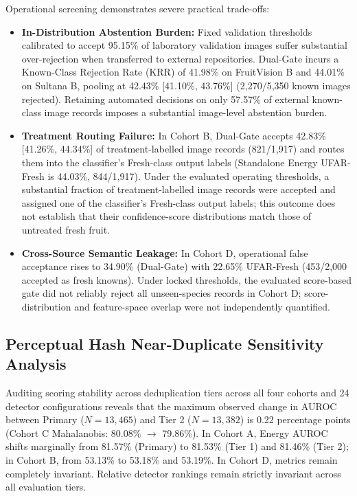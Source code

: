 Operational screening demonstrates severe practical trade-offs:
\begin{itemize}
\setlength{\itemsep}{0pt}\setlength{\parsep}{0pt}\setlength{\parskip}{0pt}\setlength{\topsep}{1pt}\setlength{\partopsep}{0pt}
\item \textbf{In-Distribution Abstention Burden:} Fixed validation thresholds calibrated to accept 95.15\% of laboratory validation images suffer substantial over-rejection when transferred to external repositories. Dual-Gate incurs a Known-Class Rejection Rate (KRR) of 41.98\% on FruitVision B and 44.01\% on Sultana B, pooling at 42.43\% [41.10\%, 43.76\%] (2,270/5,350 known images rejected). Retaining automated decisions on only 57.57\% of external known-class image records imposes a substantial image-level abstention burden.
\item \textbf{Treatment Routing Failure:} In Cohort B, Dual-Gate accepts 42.83\% [41.26\%, 44.34\%] of treatment-labelled image records (821/1,917) and routes them into the classifier's Fresh-class output labels (Standalone Energy UFAR-Fresh is 44.03\%, 844/1,917). Under the evaluated operating thresholds, a substantial fraction of treatment-labelled image records were accepted and assigned one of the classifier's Fresh-class output labels; this outcome does not establish that their confidence-score distributions match those of untreated fresh fruit.
\item \textbf{Cross-Source Semantic Leakage:} In Cohort D, operational false acceptance rises to 34.90\% (Dual-Gate) with 22.65\% UFAR-Fresh (453/2,000 accepted as fresh knowns). Under locked thresholds, the evaluated score-based gate did not reliably reject all unseen-species records in Cohort D; score-distribution and feature-space overlap were not independently quantified.
\end{itemize}

\subsection{Perceptual Hash Near-Duplicate Sensitivity Analysis}
Auditing scoring stability across deduplication tiers across all four cohorts and 24 detector configurations reveals that the maximum observed change in AUROC between Primary ($N=13,465$) and Tier 2 ($N=13,382$) is 0.22 percentage points (Cohort C Mahalanobis: 80.08\% $\to$ 79.86\%). In Cohort A, Energy AUROC shifts marginally from 81.57\% (Primary) to 81.53\% (Tier 1) and 81.46\% (Tier 2); in Cohort B, from 53.13\% to 53.18\% and 53.19\%. In Cohort D, metrics remain completely invariant. Relative detector rankings remain strictly invariant across all evaluation tiers.

